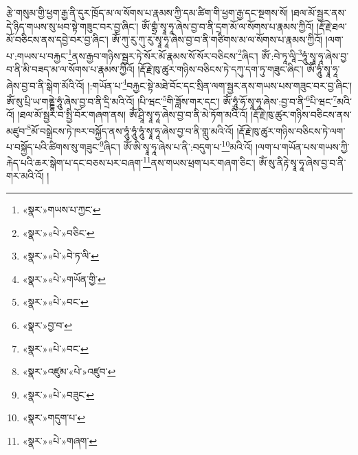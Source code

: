 རྩེ་གསུམ་གྱི་ཕྱག་རྒྱ་ནི་དུར་ཁྲོད་མ་ལ་སོགས་པ་རྣམས་ཀྱི་དམ་ཚིག་གི་ཕྱག་རྒྱ་དང་སྔགས་སོ། །ཐལ་མོ་སྦྱར་ནས་དེ་ཉིད་གཡས་སུ་ཕབ་སྟེ་གཟུང་བར་བྱ་ཞིང་། ཨོཾ་གྷྲཾ་སྭཱ་ཧཱ་ཞེས་བྱ་བ་ནི་དྲག་མོ་ལ་སོགས་པ་རྣམས་ཀྱིའོ། །རྡོ་རྗེ་ཐལ་མོ་བཅིངས་ནས་དབྱེ་བར་བྱ་ཞིང་། ཨོཾ་ཀུ་རུ་ཀུ་རུ་སྭཱ་ཧཱ་ཞེས་བྱ་བ་ནི་གཙིགས་མ་ལ་སོགས་པ་རྣམས་ཀྱིའོ། །ལག་པ་:གཡས་པ་བརྐྱང་\footnote{«སྣར་»གཡས་པ་ཀྱང་}ནས་རྒྱབ་གཉིས་སྦྱར་ཏེ་སོར་མོ་རྣམས་སོ་སོར་བཅིངས་\footnote{«སྣར་»«པེ་»བཅིང་}ཞིང་། ཨོཾ་:བེ་ཏཱ་ལཱི་\footnote{«སྣར་»«པེ་»བེ་ཏ་ལི་}ཧཱུཾ་སྭཱ་ཧཱ་ཞེས་བྱ་བ་ནི་མི་བཟད་མ་ལ་སོགས་པ་རྣམས་ཀྱིའོ། །རྡོ་རྗེ་ཁུ་ཚུར་གཉིས་བཅིངས་ཏེ་དཀུ་དག་ཏུ་གཟུང་ཞིང་། ཨོཾ་ཧཱུཾ་སྭཱ་ཧཱ་ཞེས་བྱ་བ་ནི་སྒེག་མོའི་འོ། །:གཡོན་པ་\footnote{«སྣར་»«པེ་»གཡོན་གྱི་}བརྐྱང་སྟེ་མཐེ་བོང་དང་སྲིན་ལག་སྦྱར་ནས་གཡས་པས་གཟུང་བར་བྱ་ཞིང་། ཨོཾ་སུ་པྲི་ཡ་གནྡྷེ་ཧཱུཾ་ཞེས་བྱ་བ་ནི་དྲི་མའི་འོ། །པི་ཝང་\footnote{«སྣར་»«པེ་»བང་}གི་ཟློས་གར་དང་། ཨོཾ་ཧཱུཾ་ཧོ་སྭཱ་ཧཱ་ཞེས་:བྱ་བ་ནི་\footnote{«སྣར་»བྱ་བ་}པི་ཝང་\footnote{«སྣར་»«པེ་»བང་}མའི་འོ། །ཐལ་མོ་སྦྱར་བ་སྤྱི་བོར་གཞག་ནས། ཨོཾ་ཤྲཱི་སྭཱ་ཧཱ་ཞེས་བྱ་བ་ནི་མེ་ཏོག་མའི་འོ། །རྡོ་རྗེ་ཁུ་ཚུར་གཉིས་བཅིངས་ནས་མཛུབ་\footnote{«སྣར་»འཛུམ་«པེ་»འཛུབ་}མོ་བསྒྲེངས་ཏེ་ཁར་བསྐྱོད་ནས་ཧཱུཾ་ཧཱུཾ་ཧཱུཾ་སྭཱ་ཧཱ་ཞེས་བྱ་བ་ནི་གླུ་མའི་འོ། །རྡོ་རྗེ་ཁུ་ཚུར་གཉིས་བཅིངས་ཏེ་ལག་པ་བསྐྱོད་པའི་ཚིགས་སུ་གཟུང་\footnote{«སྣར་»«པེ་»བཟུང་}ཞིང་། ཨོཾ་ཨི་སྭཱ་ཧཱ་ཞེས་པ་ནི་:བདུག་པ་\footnote{«སྣར་»གདུག་པ་}མའི་འོ། །ལག་པ་གཡོན་པས་གཡས་ཀྱི་རྐེད་པའི་ཆར་སྒེག་པ་དང་བཅས་པར་བཞག་\footnote{«སྣར་»«པེ་»གཞག་}ནས་གཡས་ཕྲག་པར་གཞག་ཅིང་། ཨོཾ་སུ་ནིརྟེ་སྭཱ་ཧཱ་ཞེས་བྱ་བ་ནི་གར་མའི་འོ། །

